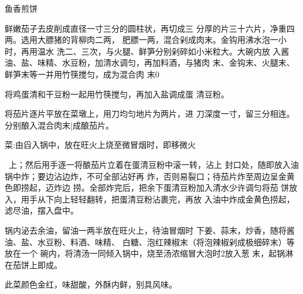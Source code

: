 \begin{recipe}{鱼香煎饼}

\ingredients


\cooking

\step 鲜嫩茄子去皮削成直径一寸三分的圆柱状，再切成三 分厚的片三十六片，净重四两。选用大膘猪的背柳肉二两， 肥膘一两，混合剁成肉末。金钩用沸水泡一小时，再用温水 洗二、三次，与火腿、鲜笋分别剁碎如小米粒大。大碗内放 入酱油、盐、味精、水豆粉，加清水调匀，再加料酒，与猪肉 末、金钩末、火腿末、鲜笋末等一并用竹筷搅匀，成为混合肉 末0

将鸡蛋清和干豆粉一起用竹筷搅匀，再加入盐调成蛋 清豆粉。

\step 将茄片逐片平放在菜墩上，用刀均匀地片为两片，进 刀深度一寸，留三分相连。分别酿入混合肉末|成酿茄片。

\step 菜:由舀入锅中，放在旺火上烧至微冒烟时，即移微火

~上；然后用手逐一将酿茄片立着在蛋清豆粉中滚一转，沾上 封口处，随即放入油锅中炸；要边沾边炸，不可全部沾好再 炸，否则易裂口；待茄片炸至周边呈金黄色即捞起，迈炸边 捞。全部炸完后，把余下蛋清豆粉加入清水少许调匀将茄 饼放入，用手从下向上轻轻翻转，把蛋清豆粉沾裹完，再放 入油中炸成金黄色捞起，滤尽油，摆入盘中。

\step 锅内泌去余油，留油一两半放在旺火上，待油冒烟时 下姜、蒜末，炒香，随将酱油、盐、水豆粉、料酒、味精、 白糖、泡红辣椒末（将泡辣椒剁成极细碎末）等放在一个 碗内，将清汤一同倾入锅中，烧至汤浓缩冒大泡时2放入葱 末，起锅淋在茄饼上即成。

\notes

此菜颜色金红，味甜酸，外酥内鲜，别具风味。

\end{recipe}

